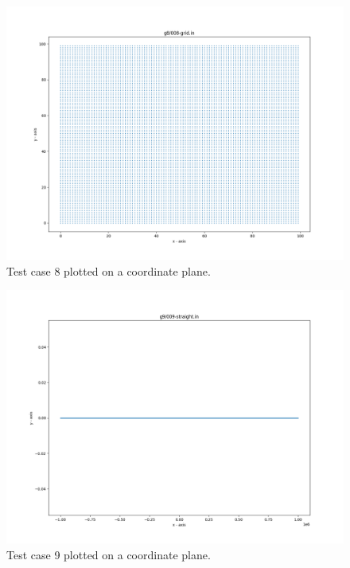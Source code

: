 \documentclass{article}
\begin{document}
\begin{appendices}
\begin{figure}[H]
	\includegraphics[scale=0.4]{code/visualizer/testdata/08.png}
	\caption{Test case 8 plotted on a coordinate plane.}
	\label{fig:08}
\end{figure}
\begin{figure}[H]
	\centering
	\includegraphics[scale=0.4]{code/visualizer/testdata/09.png}
	\caption{Test case 9 plotted on a coordinate plane.}
	\label{fig:09}
\end{figure}
\begin{figure}[H]
	\centering

\end{figure}
\end{appendices}
\end{document}
